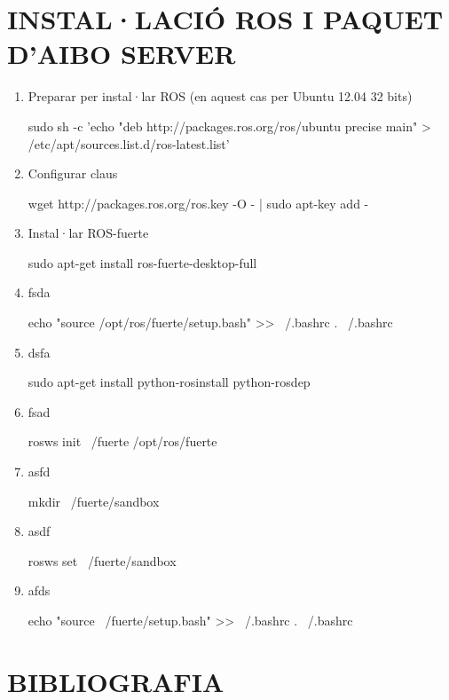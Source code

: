 \documentclass[12pt,a4paper,final,twoside]{article}
\begin{document}
\section{INSTAL·LACIÓ ROS I PAQUET D'AIBO SERVER}
\begin{enumerate}
\item Preparar per instal·lar ROS (en aquest cas per Ubuntu 12.04 32 bits)\begin{framed}{sudo sh -c 'echo "deb http://packages.ros.org/ros/ubuntu precise main" > /etc/apt/sources.list.d/ros-latest.list'}\end{framed}
\item Configurar claus \begin{framed}wget http://packages.ros.org/ros.key -O - | sudo apt-key add -\end{framed}
\item Instal·lar ROS-fuerte\begin{framed}sudo apt-get install ros-fuerte-desktop-full\end{framed}
\item fsda\begin{framed}echo "source /opt/ros/fuerte/setup.bash" >> ~/.bashrc
. ~/.bashrc\end{framed}
\item dsfa\begin{framed}sudo apt-get install python-rosinstall python-rosdep\end{framed}
\item fsad\begin{framed}rosws init ~/fuerte /opt/ros/fuerte\end{framed}
\item asfd\begin{framed}mkdir ~/fuerte/sandbox\end{framed}
\item asdf\begin{framed}rosws set ~/fuerte/sandbox\end{framed}
\item afds\begin{framed}echo "source ~/fuerte/setup.bash" >> ~/.bashrc
. ~/.bashrc\end{framed}
\end{enumerate}
\section{BIBLIOGRAFIA}
\label{Bibliografia}
\end{document}
